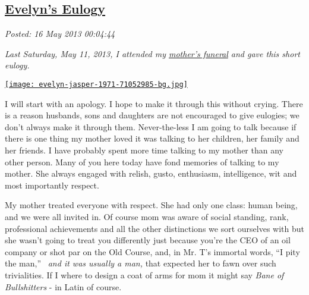 %

\subsection*{\href{http://bakerjd99.wordpress.com/2013/05/15/evelyns-eulogy/}{Evelyn's Eulogy}}


\noindent\emph{Posted: 16 May 2013 00:04:44}
\vspace{6pt}

\emph{Last Saturday, May 11, 2013, I attended my
\href{http://www.franzen-davis.com/fh/obituaries/obituary.cfm?o\_id=2084629\&fh\_id=14384}{mother's
funeral} and gave this short eulogy.~}

\medskip

\captionsetup[floatingfigure]{labelformat=empty}
\begin{floatingfigure}[l]{0.25\textwidth}
\centering
\href{http://conceptcontrol.smugmug.com/People/The-Way-We-Were/7056082\_X8X9pK\#!i=473528824\&k=mkSbVJX\&lb=1\&s=A}{\texttt{[image: evelyn-jasper-1971-71052985-bg.jpg]}}
\label{fig:4027X0}
\end{floatingfigure} I will start with an apology. I hope to make it through this without
crying. There is a reason husbands, sons and daughters are not
encouraged to give eulogies; we don't always make it through them.
Never-the-less I am going to talk because if there is one thing my
mother loved it was talking to her children, her family and her friends.
I have probably spent more time talking to my mother than any other
person. Many of you here today have fond memories of talking to my
mother. She always engaged with relish, gusto, enthusiasm, intelligence,
wit and most importantly respect.

My mother treated everyone with respect. She had only one class: human
being, and we were all invited in. Of course mom was aware of social
standing, rank, professional achievements and all the other distinctions
we sort ourselves with but she wasn't going to treat you differently
just because you're the CEO of an oil company or shot par on the Old
Course, and, in Mr. T's immortal words, ``I pity the man,'' ~\emph{and
it was usually a man,} that expected her to fawn over such trivialities.
If I where to design a coat of arms for mom it might say \emph{Bane of
Bullshitters} - in Latin of course.

